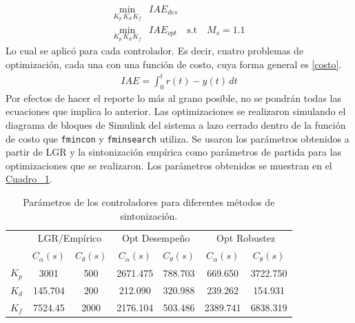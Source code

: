 \begin{equation}
    \begin{aligned}
        \underset{K_p\,K_d\,K_f}{\text{min}}&IAE_{des}\label{optimizacion}\\
        \underset{K_p\,K_d\,K_f}{\text{min}}&IAE_{opt} \quad \text{s.t} \quad M_s = 1.1
    \end{aligned}
\end{equation}
Lo cual se aplicó para cada controlador.
Es decir, cuatro problemas de optimización, cada una con una función de costo, 
cuya forma general es \eqref{costo}.
\begin{equation}
    \begin{aligned}
        IAE = \int_0^t r(t) - y(t)\,dt\label{costo}
    \end{aligned}
\end{equation}
Por efectos de hacer el reporte lo más al grano posible, no se pondrán todas 
las ecuaciones que implica lo anterior.
Las optimizaciones se realizaron simulando el diagrama de bloques de Simulink del sistema a lazo cerrado
dentro de la función de costo que \texttt{fmincon} y \texttt{fminsearch} utiliza.
Se usaron los parámetros obtenidos a partir de LGR y la sintonización empírica como parámetros de partida
para las optimizaciones que se realizaron.
Los parámetros obtenidos se muestran en el \hyperref[parametros]{Cuadro ~\ref{parametros}}.

\begin{table}
\centering
\begin{tabular}{lcccccc}
\toprule
& \multicolumn{2}{c}{LGR/Empírico} & \multicolumn{2}{c}{Opt Desempeño} & \multicolumn{2}{c}{Opt Robustez} \\
\cmidrule(lr){2-7} 
& $C_{\alpha}(s)$ & $C_{\theta}(s)$ & $C_{\alpha}(s)$ & $C_{\theta}(s)$ & $C_{\alpha}(s)$ & $C_{\theta}(s)$ \\
\midrule
$K_p$ & \SI{3001}{}  & 500   & 2671.475  & 788.703   &  669.650  &   3722.750\\
$K_d$ & \SI{145.704}{}  & 200   & 212.090   & 320.988   &  239.262  &   154.931\\
$K_f$ & \SI{7524.45}{} & 2000   & 2176.104  & 503.486   &  2389.741 &   6838.319\\
\bottomrule
\end{tabular}
\caption{Parámetros de los controladores para diferentes métodos de sintonización.}
\label{parametros}
\end{table}

